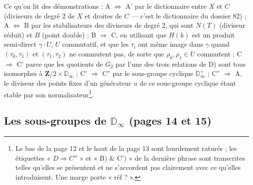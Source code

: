 \documentclass[11pt,a4paper]{article}
\begin{document}
Ce qu'on lit des démonstrations : A $\Leftrightarrow$ A' par le
dictionnaire entre $X$ et $C$ (diviseurs de degré $2$ de $X$ et droites de
$C$ --- c'est le dictionnaire du dossier 82) ; A $\Leftrightarrow$ B par les
stabilisateurs des diviseurs de degré $2$, qui sont $N(T)$ (diviseur réduit)
et $B$ (point double) ; B $\Rightarrow$ C, en utilisant que $H(k)$ est un
produit semi-direct $\gamma \cdot U$, $U$ commutatif, et que les $\tau_i$
ont même image dans $\gamma$ quand $(\tau_0, \tau_1)$ et $(\tau_1, \tau_2)$
ne commutent pas, de sorte que $\rho_0, \rho_1 \in U$ commutent ; C
$\Rightarrow$ C' parce que les quotients de $G_2$ par l'une des trois
relations de D) sont tous isomorphes à $\mathbf{Z}/2 \times \mathbb{D}_\infty$ ;
C' $\Rightarrow$ C'' par le sous-groupe cyclique $\mathbb{D}_\infty^+$ ; C''
$\Rightarrow$ A, le diviseur des points fixes d'un générateur $u$ de ce
sous-groupe cyclique étant stable par son normalisateur\footnote{Le
bas de la page 12 et le haut de la page 13 sont lourdement raturés ; les
étiquettes « $D \Rightarrow C''$ » et « B) \& C') » de la dernière phrase
sont transcrites telles qu'elles se présentent et ne s'accordent pas
clairement avec ce qu'elles introduisent. Une marge porte « réf ? ».}.

\subsection*{Les sous-groupes de $\mathbb{D}_\infty$ (pages 14 et 15)}
\end{document}
